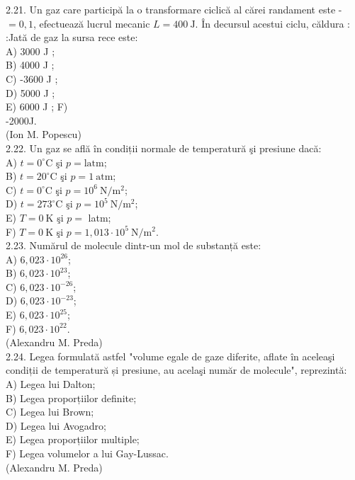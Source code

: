 2.21. Un gaz care participă la o transformare ciclică al cărei randament este - $=0,1$, efectuează lucrul mecanic $L=400 \mathrm{~J}$. În decursul acestui ciclu, căldura : :Jată de gaz la sursa rece este:\\
A) 3000 J ;\\
B) 4000 J ;\\
C) -3600 J ;\\
D) 5000 J ;\\
E) 6000 J ; F)\\
-2000J.\\
(Ion M. Popescu)\\
2.22. Un gaz se află în condiții normale de temperatură şi presiune dacă:\\
A) $t=0^{\circ} \mathrm{C}$ şi $p=\mathrm{latm}$;\\
B) $t=20^{\circ} \mathrm{C}$ şi $p=1 \mathrm{~atm}$;\\
C) $t=0^{\circ} \mathrm{C}$ şi $p=10^{6} \mathrm{~N} / \mathrm{m}^{2}$;\\
D) $t=273^{\circ} \mathrm{C}$ şi $p=10^{5} \mathrm{~N} / \mathrm{m}^{2}$;\\
E) $T=0 \mathrm{~K}$ şi $p=$ latm;\\
F) $T=0 \mathrm{~K}$ şi $p=1,013 \cdot 10^{5} \mathrm{~N} / \mathrm{m}^{2}$.\\
2.23. Numărul de molecule dintr-un mol de substanță este:\\
A) $6,023 \cdot 10^{26}$;\\
B) $6,023 \cdot 10^{23}$;\\
C) $6,023 \cdot 10^{-26}$;\\
D) $6,023 \cdot 10^{-23}$;\\
E) $6,023 \cdot 10^{25}$;\\
F) $6,023 \cdot 10^{22}$.\\
(Alexandru M. Preda)\\
2.24. Legea formulată astfel "volume egale de gaze diferite, aflate în aceleaşi condiții de temperatură și presiune, au acelaşi număr de molecule", reprezintă:\\
A) Legea lui Dalton;\\
B) Legea proporțiilor definite;\\
C) Legea lui Brown;\\
D) Legea lui Avogadro;\\
E) Legea proporțiilor multiple;\\
F) Legea volumelor a lui Gay-Lussac.\\
(Alexandru M. Preda)\\
